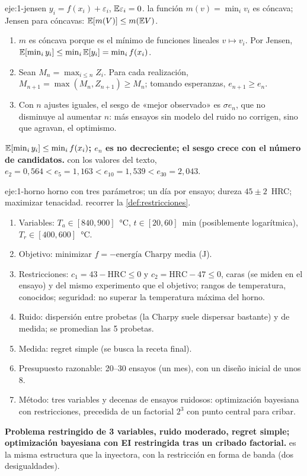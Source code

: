 \begin{solucion}{eje:1-jensen}
\datos $y_i=f(x_i)+\varepsilon_i$, $\mathbb{E}\varepsilon_i=0$.
\planteamiento la función $m(v)=\min_iv_i$ es cóncava; Jensen para cóncavas: $\mathbb{E}[m(V)]\le m(\mathbb{E} V)$.
\pasos
\begin{enumerate}[label=(\alph*)]
  \item $m$ es cóncava porque es el mínimo de funciones lineales $v\mapsto v_i$. Por Jensen, $\mathbb{E}[\min_iy_i]\le\min_i\mathbb{E}[y_i]=\min_if(x_i)$.
  \item Sean $M_n=\max_{i\le n}Z_i$. Para cada realización, $M_{n+1}=\max(M_n,Z_{n+1})\ge M_n$; tomando esperanzas, $e_{n+1}\ge e_n$.
  \item Con $n$ ajustes iguales, el sesgo de «mejor observado» es $\sigma e_n$, que no disminuye al aumentar $n$: más ensayos sin modelo del ruido no corrigen, sino que agravan, el optimismo.
\end{enumerate}
\resultado \textbf{$\mathbb{E}[\min_iy_i]\le\min_if(x_i)$; $e_n$ es no decreciente; el sesgo crece con el número de candidatos.}
\comprobacion con los valores del texto, $e_2=0{,}564<e_5=1{,}163<e_{10}=1{,}539<e_{30}=2{,}043$.
\end{solucion}

\begin{solucion}{eje:1-horno}
\datos horno con tres parámetros; un día por ensayo; dureza $45\pm2$~HRC; maximizar tenacidad.
\planteamiento recorrer la \cref{def:restricciones}.
\pasos
\begin{enumerate}[label=\arabic*.]
  \item Variables: $T_a\in[840,900]$~°C, $t\in[20,60]$~min (posiblemente logarítmica), $T_r\in[400,600]$~°C.
  \item Objetivo: minimizar $f=-\text{energía Charpy media}$ (J).
  \item Restricciones: $c_1=43-\text{HRC}\le0$ y $c_2=\text{HRC}-47\le0$, caras (se miden en el ensayo) y del mismo experimento que el objetivo; rangos de temperatura, conocidos; seguridad: no superar la temperatura máxima del horno.
  \item Ruido: dispersión entre probetas (la Charpy suele dispersar bastante) y de medida; se promedian las 5 probetas.
  \item Medida: regret simple (se busca la receta final).
  \item Presupuesto razonable: 20–30 ensayos (un mes), con un diseño inicial de unos 8.
  \item Método: tres variables y decenas de ensayos ruidosos: optimización bayesiana con restricciones, precedida de un factorial $2^3$ con punto central para cribar.
\end{enumerate}
\resultado \textbf{Problema restringido de 3 variables, ruido moderado, regret simple; optimización bayesiana con EI restringida tras un cribado factorial.}
\comprobacion es la misma estructura que la inyectora, con la restricción en forma de banda (dos desigualdades).
\end{solucion}

